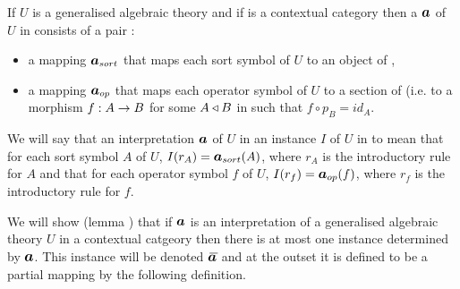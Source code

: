 \begin{definition}
If $U$ is a generalised algebraic theory  and if \catcw is a contextual category then
a  $\iI$ of  $U$ in \catcw consists of a pair :
\begin{itemize}
\item a mapping $\Isort$ that maps each sort symbol of $U$ to  an object of \catc,
\item a mapping $\Iop$ that maps each operator symbol of $U$ to a section of \catcw (i.e. to a morphism $f: A \rightarrow B$ for some 
$A \triangleleft B$ in \catcw such that $f \circ p_B=id_A$.
\end{itemize}
\end{definition}

We will say that  an interpretation $\iI$ of $U$ in \catcw {} an  instance $I$ of $U$ in \catcw to mean that for each sort symbol $A$ of $U$,
$I(r_A) = \iI_{sort}(A)$, where $r_A$ is the introductory rule for $A$ and that for each operator symbol
$f$ of $U$,   $I(r_f) = \iI_{op}(f)$, where $r_f$ is the introductory rule for $f$.

We will show (lemma ) that 
if $\iI$ is an interpretation of a generalised algebraic theory $U$ in a contextual catgeory \catcw then
there is at most one  instance determined by $\iI$. This instance will be denoted $\Ibar$ and at the outset 
it is defined to be a partial mapping by the following definition.

